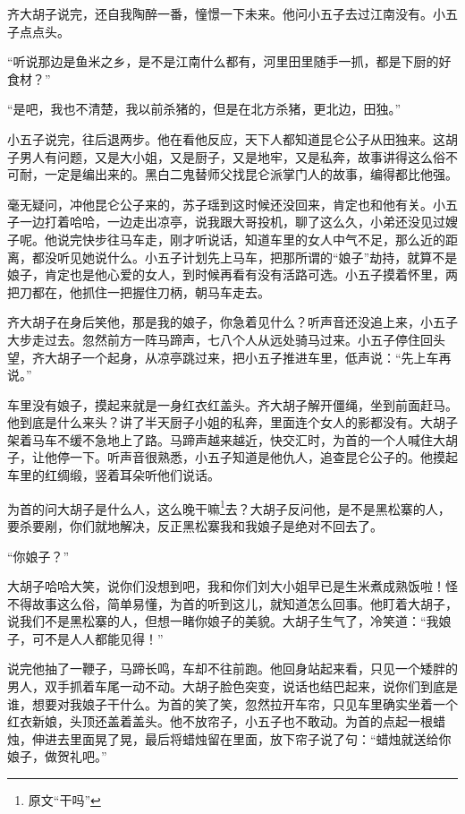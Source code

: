 齐大胡子说完，还自我陶醉一番，憧憬一下未来。他问小五子去过江南没有。小五子点点头。

“听说那边是鱼米之乡，是不是江南什么都有，河里田里随手一抓，都是下厨的好食材？”

“是吧，我也不清楚，我以前杀猪的，但是在北方杀猪，更北边，田独。”

小五子说完，往后退两步。他在看他反应，天下人都知道昆仑公子从田独来。这胡子男人有问题，又是大小姐，又是厨子，又是地牢，又是私奔，故事讲得这么俗不可耐，一定是编出来的。黑白二鬼替师父找昆仑派掌门人的故事，编得都比他强。

毫无疑问，冲他昆仑公子来的，苏子瑶到这时候还没回来，肯定也和他有关。小五子一边打着哈哈，一边走出凉亭，说我跟大哥投机，聊了这么久，小弟还没见过嫂子呢。他说完快步往马车走，刚才听说话，知道车里的女人中气不足，那么近的距离，都没听见她说什么。小五子计划先上马车，把那所谓的“娘子”劫持，就算不是娘子，肯定也是他心爱的女人，到时候再看有没有活路可选。小五子摸着怀里，两把刀都在，他抓住一把握住刀柄，朝马车走去。

齐大胡子在身后笑他，那是我的娘子，你急着见什么？听声音还没追上来，小五子大步走过去。忽然前方一阵马蹄声，七八个人从远处骑马过来。小五子停住回头望，齐大胡子一个起身，从凉亭跳过来，把小五子推进车里，低声说：“先上车再说。”

车里没有娘子，摸起来就是一身红衣红盖头。齐大胡子解开僵绳，坐到前面赶马。他到底是什么来头？讲了半天厨子小姐的私奔，里面连个女人的影都没有。大胡子架着马车不缓不急地上了路。马蹄声越来越近，快交汇时，为首的一个人喊住大胡子，让他停一下。听声音很熟悉，小五子知道是他仇人，追查昆仑公子的。他摸起车里的红绸缎，竖着耳朵听他们说话。

为首的问大胡子是什么人，这么晚干嘛\footnote{原文“干吗”}去？大胡子反问他，是不是黑松寨的人，要杀要剐，你们就地解决，反正黑松寨我和我娘子是绝对不回去了。

“你娘子？”

大胡子哈哈大笑，说你们没想到吧，我和你们刘大小姐早已是生米煮成熟饭啦！怪不得故事这么俗，简单易懂，为首的听到这儿，就知道怎么回事。他盯着大胡子，说我们不是黑松寨的人，但想一睹你娘子的美貌。大胡子生气了，冷笑道：“我娘子，可不是人人都能见得！”

说完他抽了一鞭子，马蹄长鸣，车却不往前跑。他回身站起来看，只见一个矮胖的男人，双手抓着车尾一动不动。大胡子脸色突变，说话也结巴起来，说你们到底是谁，想要对我娘子干什么。为首的笑了笑，忽然拉开车帘，只见车里确实坐着一个红衣新娘，头顶还盖着盖头。他不放帘子，小五子也不敢动。为首的点起一根蜡烛，伸进去里面晃了晃，最后将蜡烛留在里面，放下帘子说了句：“蜡烛就送给你娘子，做贺礼吧。”

